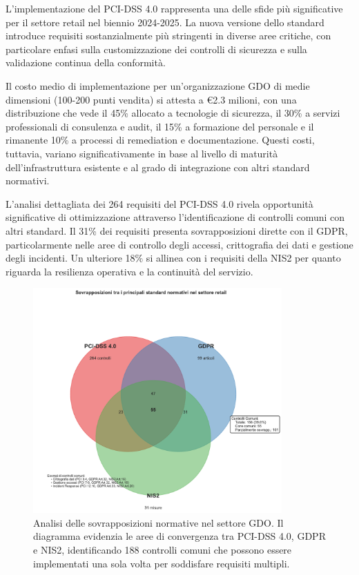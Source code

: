 L'implementazione del PCI-DSS 4.0 rappresenta una delle sfide più significative per il settore retail nel biennio 2024-2025. La nuova versione dello standard introduce requisiti sostanzialmente più stringenti in diverse aree critiche, con particolare enfasi sulla customizzazione dei controlli di sicurezza e sulla validazione continua della conformità.

Il costo medio di implementazione per un'organizzazione GDO di medie dimensioni (100-200 punti vendita) si attesta a €2.3 milioni\footnotemark[3], con una distribuzione che vede il 45\% allocato a tecnologie di sicurezza, il 30\% a servizi professionali di consulenza e audit, il 15\% a formazione del personale e il rimanente 10\% a processi di remediation e documentazione. Questi costi, tuttavia, variano significativamente in base al livello di maturità dell'infrastruttura esistente e al grado di integrazione con altri standard normativi.


L'analisi dettagliata dei 264 requisiti del PCI-DSS 4.0 rivela opportunità significative di ottimizzazione attraverso l'identificazione di controlli comuni con altri standard. Il 31\% dei requisiti presenta sovrapposizioni dirette con il GDPR, particolarmente nelle aree di controllo degli accessi, crittografia dei dati e gestione degli incidenti. Un ulteriore 18\% si allinea con i requisiti della NIS2 per quanto riguarda la resilienza operativa e la continuità del servizio.

\begin{figure}[htbp]
\centering
\includegraphics[width=0.85\textwidth]{thesis_figures/cap4/figura_4_1_venn_normative.pdf}
\caption{Analisi delle sovrapposizioni normative nel settore GDO. Il diagramma evidenzia le aree di convergenza tra PCI-DSS 4.0, GDPR e NIS2, identificando 188 controlli comuni che possono essere implementati una sola volta per soddisfare requisiti multipli.}
\label{fig:venn_normative}
\end{figure}

